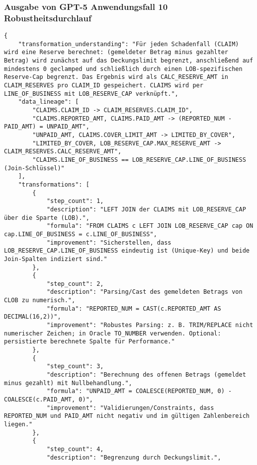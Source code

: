 \subsubsection{Ausgabe von GPT-5 Anwendungsfall 10 Robustheitsdurchlauf}\label{anhang:subsubsec:gpt_case10_prompt3}
\begin{lstlisting}[caption={Ausgabe: GPT-5 Anwendungsfall 10 Robustheitsdurchlauf},label={gpt_case10_prompt3}]
{
    "transformation_understanding": "Für jeden Schadenfall (CLAIM) wird eine Reserve berechnet: (gemeldeter Betrag minus gezahlter Betrag) wird zunächst auf das Deckungslimit begrenzt, anschließend auf mindestens 0 geclamped und schließlich durch einen LOB-spezifischen Reserve-Cap begrenzt. Das Ergebnis wird als CALC_RESERVE_AMT in CLAIM_RESERVES pro CLAIM_ID gespeichert. CLAIMS wird per LINE_OF_BUSINESS mit LOB_RESERVE_CAP verknüpft.",
    "data_lineage": [
        "CLAIMS.CLAIM_ID -> CLAIM_RESERVES.CLAIM_ID",
        "CLAIMS.REPORTED_AMT, CLAIMS.PAID_AMT -> (REPORTED_NUM - PAID_AMT) = UNPAID_AMT",
        "UNPAID_AMT, CLAIMS.COVER_LIMIT_AMT -> LIMITED_BY_COVER",
        "LIMITED_BY_COVER, LOB_RESERVE_CAP.MAX_RESERVE_AMT -> CLAIM_RESERVES.CALC_RESERVE_AMT",
        "CLAIMS.LINE_OF_BUSINESS == LOB_RESERVE_CAP.LINE_OF_BUSINESS (Join-Schlüssel)"
    ],
    "transformations": [
        {
            "step_count": 1,
            "description": "LEFT JOIN der CLAIMS mit LOB_RESERVE_CAP über die Sparte (LOB).",
            "formula": "FROM CLAIMS c LEFT JOIN LOB_RESERVE_CAP cap ON cap.LINE_OF_BUSINESS = c.LINE_OF_BUSINESS",
            "improvement": "Sicherstellen, dass LOB_RESERVE_CAP.LINE_OF_BUSINESS eindeutig ist (Unique-Key) und beide Join-Spalten indiziert sind."
        },
        {
            "step_count": 2,
            "description": "Parsing/Cast des gemeldeten Betrags von CLOB zu numerisch.",
            "formula": "REPORTED_NUM = CAST(c.REPORTED_AMT AS DECIMAL(16,2))",
            "improvement": "Robustes Parsing: z. B. TRIM/REPLACE nicht numerischer Zeichen; in Oracle TO_NUMBER verwenden. Optional: persistierte berechnete Spalte für Performance."
        },
        {
            "step_count": 3,
            "description": "Berechnung des offenen Betrags (gemeldet minus gezahlt) mit Nullbehandlung.",
            "formula": "UNPAID_AMT = COALESCE(REPORTED_NUM, 0) - COALESCE(c.PAID_AMT, 0)",
            "improvement": "Validierungen/Constraints, dass REPORTED_NUM und PAID_AMT nicht negativ und im gültigen Zahlenbereich liegen."
        },
        {
            "step_count": 4,
            "description": "Begrenzung durch Deckungslimit.",

\end{lstlisting}
